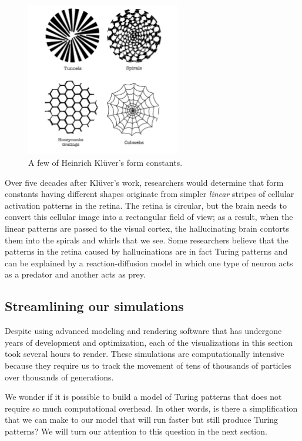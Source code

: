 \begin{figure}[h]
\centering
\mySfFamily
\includegraphics[width = 0.6\textwidth]{../images/form_constants.png}
\caption{A few of Heinrich Klüver's form constants.}
\label{fig:form_constants}
\end{figure}

Over five decades after Klüver's work, researchers would determine that form constants having different shapes originate from simpler \textit{linear} stripes of cellular activation patterns in the retina. The retina is circular, but the brain needs to convert this cellular image into a rectangular field of view; as a result, when the linear patterns are passed to the visual cortex, the hallucinating brain contorts them into the spirals and whirls that we see. Some researchers believe that the patterns in the retina caused by hallucinations are in fact Turing patterns and can be explained by a reaction-diffusion model in which one type of neuron acts as a predator and another acts as prey.

\FloatBarrier
{}
\subsection{Streamlining our simulations}

Despite using advanced modeling and rendering software that has undergone years of development and optimization, each of the visualizations in this section took several hours to render. These simulations are computationally intensive because they require us to track the movement of tens of thousands of particles over thousands of generations.

We wonder if it is possible to build a model of Turing patterns that does not require so much computational overhead. In other words, is there a simplification that we can make to our model that will run faster but still produce Turing patterns? We will turn our attention to this question in the next section.\\

